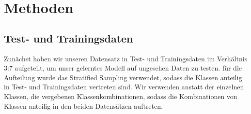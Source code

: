 \section{Methoden}

\subsection{Test- und Trainingsdaten}
\label{sub:test_und_trainingsdaten}
Zunächst haben wir unseren Datensatz in Test- und Trainingsdaten im Verhältnis 3:7 aufgeteilt, um unser gelerntes Modell auf ungesehen Daten zu testen. für die Aufteilung wurde das Stratified Sampling verwendet, sodass die Klassen anteilig in Test- und Trainingsdaten vertreten sind. Wir verwenden anstatt der einzelnen Klassen, die vergebenen Klassenkombinationen, sodass die Kombinationen von Klassen anteilig in den beiden Datensätzen auftreten.


